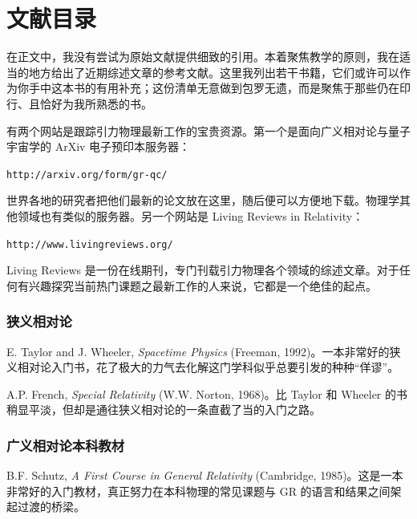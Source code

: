 
\chapter*{文献目录}

在正文中，我没有尝试为原始文献提供细致的引用。本着聚焦教学的原则，我在适当的地方给出了近期综述文章的参考文献。这里我列出若干书籍，它们或许可以作为你手中这本书的有用补充；这份清单无意做到包罗无遗，而是聚焦于那些仍在印行、且恰好为我所熟悉的书。

有两个网站是跟踪引力物理最新工作的宝贵资源。第一个是面向广义相对论与量子宇宙学的 ArXiv 电子预印本服务器：

\begin{center}
\texttt{http://arxiv.org/form/gr-qc/}
\end{center}

世界各地的研究者把他们最新的论文放在这里，随后便可以方便地下载。物理学其他领域也有类似的服务器。另一个网站是 Living Reviews in Relativity：

\begin{center}
\texttt{http://www.livingreviews.org/}
\end{center}

Living Reviews 是一份在线期刊，专门刊载引力物理各个领域的综述文章。对于任何有兴趣探究当前热门课题之最新工作的人来说，它都是一个绝佳的起点。

\subsection*{狭义相对论}

E. Taylor and J. Wheeler, \emph{Spacetime Physics} (Freeman, 1992)。一本非常好的狭义相对论入门书，花了极大的力气去化解这门学科似乎总要引发的种种“佯谬”。

A.P. French, \emph{Special Relativity} (W.W. Norton, 1968)。比 Taylor 和 Wheeler 的书稍显平淡，但却是通往狭义相对论的一条直截了当的入门之路。

\subsection*{广义相对论本科教材}

B.F. Schutz, \emph{A First Course in General Relativity} (Cambridge, 1985)。这是一本非常好的入门教材，真正努力在本科物理的常见课题与 GR 的语言和结果之间架起过渡的桥梁。

